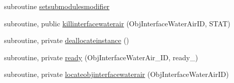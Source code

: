 \begin{DoxyCompactItemize}
subroutine \mbox{\hyperlink{namespacemoduleinterfacewaterair_a5f28ad0176312886bacef9cc171cb2e1}{setsubmodulesmodifier}}
\item 
subroutine, public \mbox{\hyperlink{namespacemoduleinterfacewaterair_a9492d98237c53dd77ad30ffe270b64cd}{killinterfacewaterair}} (Obj\+Interface\+Water\+Air\+ID, S\+T\+AT)
\item 
subroutine, private \mbox{\hyperlink{namespacemoduleinterfacewaterair_ab0b32961ac4c2950c8d474148dba7b1d}{deallocateinstance}} ()
\item 
subroutine, private \mbox{\hyperlink{namespacemoduleinterfacewaterair_a519b1351dce06ffef1eb101335e6361f}{ready}} (Obj\+Interface\+Water\+Air\+\_\+\+ID, ready\+\_\+)
\item 
subroutine, private \mbox{\hyperlink{namespacemoduleinterfacewaterair_a17c41a363434acdb52729214d81e9e86}{locateobjinterfacewaterair}} (Obj\+Interface\+Water\+Air\+ID)
\end{DoxyCompactItemize}
